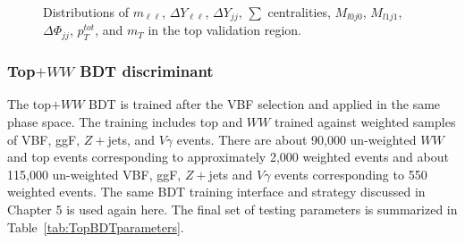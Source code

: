 \begin{figure}[!h]
{  }\hfill
  \hfill
  \hfill
{\caption{Distributions of $m_{\ell\ell}$, $\Delta Y_{\ell\ell}$, $\Delta Y_{jj}$, $\sum$ centralities, $M_{l0j0}$, $M_{l1j1}$, $\Delta\Phi_{jj}$, $p_T^{tot}$, and $m_T$ in the top validation region.
\label{fig:TopCR3}}}
\end{figure}

\subsubsection{Top$+WW$ BDT discriminant}

The top$+WW$ BDT is trained after the VBF selection and applied in the same phase space. The training includes top and $WW$ trained against weighted samples of VBF, ggF, $Z+$jets, and $V\gamma$ events. There are about 90,000 un-weighted $WW$ and top events corresponding to approximately 2,000 weighted events and about 115,000 un-weighted VBF, ggF, $Z+$jets and $V\gamma$ events corresponding to 550 weighted events. The same BDT training interface and strategy discussed in Chapter 5 is used again here. The final set of testing parameters is summarized in Table~\ref{tab:TopBDTparameters}.

